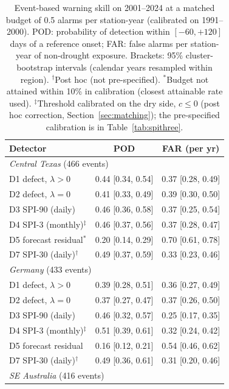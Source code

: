\begin{table}[tbp]
\caption{Event-based warning skill on 2001--2024 at a matched budget of 0.5 alarms per
station-year (calibrated on 1991--2000). POD: probability of detection within $[-60,+120]$ days of a
reference onset; FAR: false alarms per station-year of non-drought exposure. Brackets: 95\%
cluster-bootstrap intervals (calendar years resampled within region). $^{\dagger}$Post hoc (not
pre-specified). $^{\ast}$Budget not attained within 10\% in calibration (closest attainable rate used).
$^{\ddagger}$Threshold calibrated on the dry side, $c\le0$ (post hoc correction,
Section~\ref{sec:matching}); the pre-specified calibration is in
Table~\ref{tab:spithree}.}
\label{tab:warning05}
\footnotesize\setlength{\tabcolsep}{2pt}
\begin{tabular*}{\textwidth}{@{\extracolsep\fill}lcc}
\toprule
Detector & POD & FAR (per yr)\\
\midrule
\multicolumn{3}{l}{\textit{Central Texas} (466 events)}\\
\quad D1 defect, $\lambda>0$ & 0.44 [0.34, 0.54] & 0.37 [0.28, 0.49] \\
\quad D2 defect, $\lambda=0$ & 0.41 [0.33, 0.49] & 0.39 [0.30, 0.50] \\
\quad D3 SPI-90 (daily) & 0.46 [0.36, 0.58] & 0.37 [0.25, 0.54] \\
\quad D4 SPI-3 (monthly)$^{\ddagger}$ & 0.46 [0.37, 0.56] & 0.37 [0.28, 0.47] \\
\quad D5 forecast residual$^{\ast}$ & 0.20 [0.14, 0.29] & 0.70 [0.61, 0.78] \\
\quad D7 SPI-30 (daily)$^{\dagger}$ & 0.49 [0.37, 0.59] & 0.33 [0.23, 0.46] \\
\midrule
\multicolumn{3}{l}{\textit{Germany} (433 events)}\\
\quad D1 defect, $\lambda>0$ & 0.39 [0.28, 0.51] & 0.36 [0.27, 0.49] \\
\quad D2 defect, $\lambda=0$ & 0.37 [0.27, 0.47] & 0.37 [0.26, 0.50] \\
\quad D3 SPI-90 (daily) & 0.46 [0.32, 0.57] & 0.25 [0.17, 0.35] \\
\quad D4 SPI-3 (monthly)$^{\ddagger}$ & 0.51 [0.39, 0.61] & 0.32 [0.24, 0.42] \\
\quad D5 forecast residual & 0.16 [0.12, 0.21] & 0.54 [0.46, 0.62] \\
\quad D7 SPI-30 (daily)$^{\dagger}$ & 0.49 [0.36, 0.61] & 0.31 [0.20, 0.46] \\
\midrule
\multicolumn{3}{l}{\textit{SE Australia} (416 events)}\\

\end{tabular*}
\end{table}
